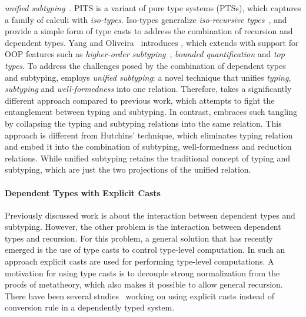\emph{unified subtyping}~\cite{full}. PITS is a variant of pure type systems (PTSs),
which captures a family of calculi with \emph{iso-types}. Iso-types generalize \emph{iso-recursive
types}~\cite{tapl}, and provide a simple form of
type casts to address the combination of recursion and
dependent types.
Yang and Oliveira~\cite{full} introduces \name, which extends
\lami with support for OOP features such as
\emph{higher-order subtyping}~\cite{fsubo}, \emph{bounded quantification} and
\emph{top types}.
To address the challenges posed by
the combination of dependent types and subtyping, \name
employs \emph{unified subtyping}: a novel technique that unifies
\emph{typing}, \emph{subtyping} and \emph{well-formedness} into one
relation. Therefore, \name takes a significantly different
approach compared to previous work, which
attempts to fight the entanglement between typing and subtyping. In
contrast, \name embraces such
tangling by collapsing the typing and subtyping
relations into the same relation. This approach is different from
Hutchins' technique, which eliminates typing relation and embed it into
the combination of subtyping, well-formedness and reduction relations.
While unified subtyping
retains the traditional concept of typing and subtyping, which are just the two
projections of the unified relation.


\paragraph{Dependent Types with Explicit Casts} Previously
discussed work is about the interaction between dependent types and
subtyping. However, the other problem is the
interaction between dependent types and recursion. For this
problem, a general solution that has recently emerged is the use
of type casts to control type-level computation. In such an approach explicit casts
are used for performing type-level computations. A motivation for
using type casts is to decouple strong normalization from the
proofs of metatheory, which also makes it possible to allow general
recursion. There have been several studies~\cite{guru,sjoberg:msfp12,
  kimmel:plpv, zombie:popl15, fc:kind, Doorn:2013hq,isotype} working
on using explicit casts instead of conversion rule in a dependently
typed system. 

